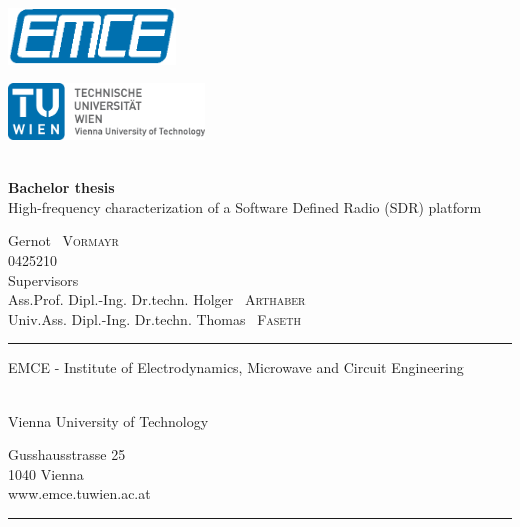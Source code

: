 \documentclass[12pt,a4paper,parskip=full,abstracton]{scrartcl}
\begin{document}
\begin{titlepage}
    \enlargethispage{1cm}
    \centering
    \begin{minipage}{0.49\linewidth}
        \includegraphics[height=1.5cm,keepaspectratio]{EMCE_Logo_CMYK_color}
    \end{minipage}
    \begin{minipage}{0.49\linewidth}
        \flushright
        \includegraphics[height=1.5cm,keepaspectratio]{TULogo_CMYK}
    \end{minipage}\\
    \vspace*{5cm}
    {\Huge \textbf{Bachelor thesis}}\\
    \vspace*{1cm}
    {\Large High-frequency characterization of a Software Defined Radio (SDR) platform}

    \vspace*{2cm}
    {\large Gernot ~\textsc{Vormayr} ~\\ 0425210 } ~\\ 

    \vfill
    {Supervisors} ~\\\vspace*{0.1cm}
    {Ass.Prof. Dipl.-Ing. Dr.techn. \large Holger ~\textsc{Arthaber}} ~\\
    {Univ.Ass. Dipl.-Ing. Dr.techn. \large Thomas ~\textsc{Faseth}}
    \vspace*{2cm}

    \rule{\linewidth}{0.4pt}
    \begin{minipage}[t]{0.55\linewidth}
        \flushleft
        \begin{large}
            EMCE - Institute of Electrodynamics, Microwave and Circuit Engineering
        \end{large}\\
        Vienna University of Technology
    \end{minipage}
    \hfill
    \begin{minipage}[t]{0.27\linewidth}
        \flushright
        Gusshausstrasse 25\\
        1040 Vienna\\
        www.emce.tuwien.ac.at
    \end{minipage}
    \vspace*{-3pt}
    \rule{\linewidth}{0.4pt}
    \clearpage
\end{titlepage}
\end{document}
